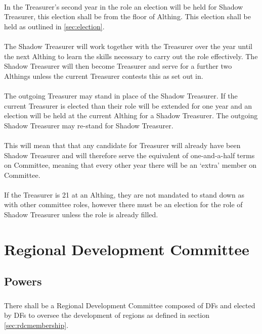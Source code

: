 \documentclass[a4paper, 12pt]{article}
\begin{document}
\paragraph{}
In the Treasurer's second year in the role an election will be held for Shadow Treasurer, this election shall be from the floor of Althing. This election shall be held as outlined in \ref{sec:election}.
\paragraph{}
The Shadow Treasurer will work together with the Treasurer over the year until the next Althing to learn the skills necessary to carry out the role effectively. The Shadow Treasurer will then become Treasurer and serve for a further two Althings unless the current Treasurer contests this as set out in.
\paragraph{}
The outgoing Treasurer may stand in place of the Shadow Treasurer. If the current Treasurer is elected than their role will be extended for one year and an election will be held at the current Althing for a Shadow Treasurer. The outgoing Shadow Treasurer may re-stand for Shadow Treasurer.
\paragraph{}
This will mean that that any candidate for Treasurer will already have been Shadow Treasurer and will therefore serve the equivalent of one-and-a-half terms on Committee, meaning that every other year there will be an `extra' member on Committee.
\paragraph{}
\label{sec:treasurergreyarea}
If the Treasurer is 21 at an Althing, they are not mandated to stand down as with other committee roles, however there must be an election for the role of Shadow Treasurer unless the role is already filled.

\section{Regional Development Committee}
\subsection{Powers}
\subsubsection{}
There shall be a Regional Development Committee composed of DFs and elected by DFs to oversee the development of regions as defined in section \ref{sec:rdcmembership}.
\end{document}
